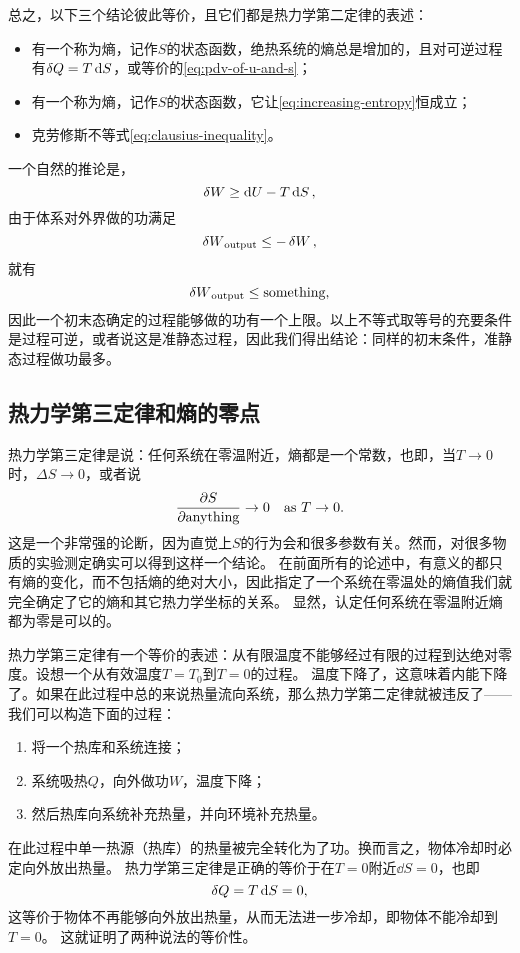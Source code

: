 \documentclass[hyperref, UTF8, a4paper]{ctexart}
\begin{document}
总之，以下三个结论彼此等价，且它们都是热力学第二定律的表述：
\begin{itemize}
    \item 有一个称为熵，记作$S$的状态函数，绝热系统的熵总是增加的，且对可逆过程有$\var{Q}=T\dd{S}$，或等价的\eqref{eq:pdv-of-u-and-s}；
    \item 有一个称为熵，记作$S$的状态函数，它让\eqref{eq:increasing-entropy}恒成立；
    \item 克劳修斯不等式\eqref{eq:clausius-inequality}。
\end{itemize}

一个自然的推论是，
\[
    \var{W} \geq \dd{U} - T \dd{S},
\]
由于体系对外界做的功满足%
\[
    \var{W}_\text{output} \leq - \var{W},
\]
就有%
\begin{equation}
    \var{W}_\text{output} \leq \text{something},
\end{equation}
因此一个初末态确定的过程能够做的功有一个上限。以上不等式取等号的充要条件是过程可逆，或者说这是准静态过程，因此我们得出结论：同样的初末条件，准静态过程做功最多。

\subsection{热力学第三定律和熵的零点}

热力学第三定律是说：任何系统在零温附近，熵都是一个常数，也即，当$T\to 0$时，$\Delta S \to 0$，或者说
\[
    \pdv{S}{\text{anything}} \to 0 \quad \text{as $T \to 0$}.
\]
这是一个非常强的论断，因为直觉上$S$的行为会和很多参数有关。然而，对很多物质的实验测定确实可以得到这样一个结论。
在前面所有的论述中，有意义的都只有熵的变化，而不包括熵的绝对大小，因此指定了一个系统在零温处的熵值我们就完全确定了它的熵和其它热力学坐标的关系。
显然，认定任何系统在零温附近熵都为零是可以的。

热力学第三定律有一个等价的表述：从有限温度不能够经过有限的过程到达绝对零度。设想一个从有效温度$T=T_0$到$T=0$的过程。
温度下降了，这意味着内能下降了。如果在此过程中总的来说热量流向系统，那么热力学第二定律就被违反了——我们可以构造下面的过程：
\begin{enumerate}
    \item 将一个热库和系统连接；
    \item 系统吸热$Q$，向外做功$W$，温度下降；
    \item 然后热库向系统补充热量，并向环境补充热量。
\end{enumerate}
在此过程中单一热源（热库）的热量被完全转化为了功。换而言之，物体冷却时必定向外放出热量。
热力学第三定律是正确的等价于在$T=0$附近$\dd{S}=0$，也即
\[
    \var{Q} = T \dd{S} = 0,
\]
这等价于物体不再能够向外放出热量，从而无法进一步冷却，即物体不能冷却到$T=0$。
这就证明了两种说法的等价性。
\end{document}
